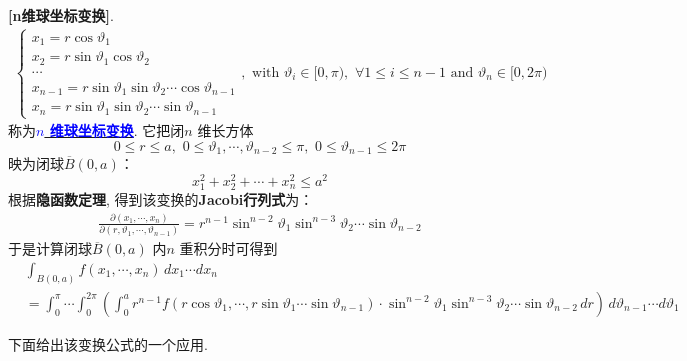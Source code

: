 	\vspace{1em}
	
	\begin{defn}\label{def A.6.1}
		\textbf{[n维球坐标变换]}.
		\begin{align}
			\begin{cases}
				x_1 = r \cos{\vartheta_1} \\
				x_2 = r \sin{\vartheta_1} \cos{\vartheta_2} \\
				\cdots \\
				x_{n - 1} = r \sin{\vartheta_1} \sin{\vartheta_2} \cdots \cos{\vartheta_{n - 1}} \\
				x_n = r \sin{\vartheta_1} \sin{\vartheta_2} \cdots \sin{\vartheta_{n - 1}}
			\end{cases} , 
			\,\, \text{with} \,\, 
			\vartheta_i \in [0 , \pi) , \,\, \forall 1 \leq i \leq n - 1 
			\,\, \text{and} \,\, 
			\vartheta_n \in [0 , 2\pi)
		\end{align}
		称为\underline{\textcolor{blue}{\textbf{$n$ 维球坐标变换}}}. 它把闭$n$ 维长方体
		\[ 0 \leq r \leq a , \,\, 0 \leq \vartheta_1 , \cdots , \vartheta_{n - 2} \leq \pi , \,\, 0 \leq \vartheta_{n - 1} \leq 2\pi \]
		映为闭球$\overline{B}(0 , a)$：
		\[ x_{1}^2 + x_{2}^2 + \cdots + x_{n}^2 \leq a^2 \]
		根据\textbf{隐函数定理}, 得到该变换的\textbf{Jacobi行列式}为：
		\begin{align}
			\frac{\partial (x_1 , \cdots , x_n)}{\partial (r , \vartheta_1 , \cdots , \vartheta_{n - 1})} = r^{n - 1} \sin^{n - 2} \vartheta_1 \sin^{n - 3} \vartheta_{2} \cdots \sin \vartheta_{n - 2}
		\end{align}
		于是计算闭球$\overline{B}(0 , a)$ 内$n$ 重积分时可得到
		\begin{align}
			&\int_{B(0 , a)} f(x_1 , \cdots , x_n) \, dx_1 \cdots dx_n \\
			&= \int_{0}^\pi \cdots \int_{0}^{2\pi} \left( \int_{0}^a r^{n - 1} f(r\cos \vartheta_1 , \cdots , r \sin \vartheta_1 \cdots \sin \vartheta_{n - 1}) \cdot \sin^{n - 2} \vartheta_1 \sin^{n - 3} \vartheta_{2} \cdots \sin \vartheta_{n - 2}  \, dr \right) \, d \vartheta_{n - 1} \cdots d\vartheta_1
		\end{align}
	\end{defn}
	
	\vspace{6em}
	
	下面给出该变换公式的一个应用. 
	
